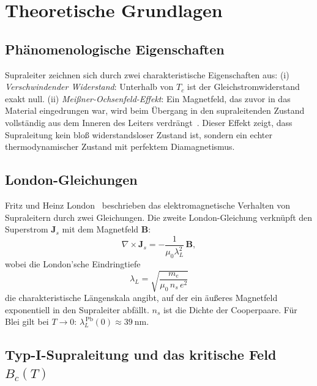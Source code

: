 \section{Theoretische Grundlagen}
\label{sec:theorie}

\subsection{Phänomenologische Eigenschaften}

Supraleiter zeichnen sich durch zwei charakteristische Eigenschaften aus:
(i) \emph{Verschwindender Widerstand}: Unterhalb von $T_c$ ist der Gleichstromwiderstand exakt null.
(ii) \emph{Meißner-Ochsenfeld-Effekt}: Ein Magnetfeld, das zuvor in das Material eingedrungen war, wird beim Übergang in den supraleitenden Zustand vollständig aus dem Inneren des Leiters verdrängt~\cite{Meissner1933}.
Dieser Effekt zeigt, dass Supraleitung kein bloß widerstandsloser Zustand ist, sondern ein echter thermodynamischer Zustand mit perfektem Diamagnetismus.

\subsection{London-Gleichungen}

Fritz und Heinz London~\cite{London1935} beschrieben das elektromagnetische Verhalten von Supraleitern durch zwei Gleichungen.
Die zweite London-Gleichung verknüpft den Superstrom $\mathbf{J}_s$ mit dem Magnetfeld $\mathbf{B}$:
\begin{equation}
    \nabla \times \mathbf{J}_s = -\frac{1}{\mu_0 \lambda_L^2}\,\mathbf{B},
    \label{eq:london2}
\end{equation}
wobei die London'sche Eindringtiefe
\begin{equation}
    \lambda_L = \sqrt{\frac{m_e}{\mu_0\, n_s\, e^2}}
    \label{eq:lambda}
\end{equation}
die charakteristische Längenskala angibt, auf der ein äußeres Magnetfeld exponentiell in den Supraleiter abfällt.
$n_s$ ist die Dichte der Cooperpaare.
Für Blei gilt bei $T \to 0$: $\lambda_L^{\,\mathrm{Pb}}(0) \approx 39~\mathrm{nm}$.

\subsection{Typ-I-Supraleitung und das kritische Feld $B_c(T)$}

